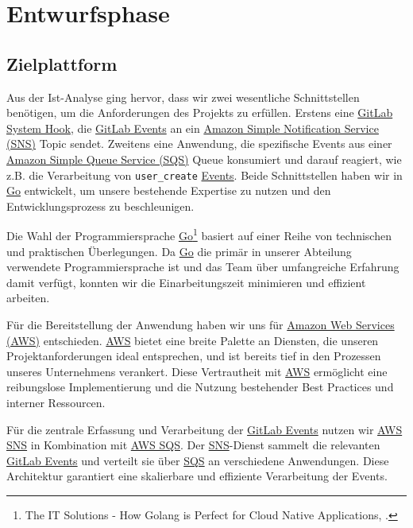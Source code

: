 \section{Entwurfsphase} 
\label{sec:Entwurfsphase}

\subsection{Zielplattform}
\label{sec:Zielplattform}

Aus der Ist-Analyse ging hervor, dass wir zwei wesentliche Schnittstellen benötigen, um die Anforderungen des Projekts zu erfüllen. Erstens eine \hyperlink{GitLabSystemhooks}{\textcolor{AOBlau}{GitLab System Hook}}, die \hyperlink{GitLabEvent}{\textcolor{AOBlau}{GitLab Events}} an ein \hyperlink{SNS}{\textcolor{AOBlau}{Amazon Simple Notification Service (SNS)}} Topic sendet. Zweitens eine Anwendung, die spezifische Events aus einer \hyperlink{SQS}{\textcolor{AOBlau}{Amazon Simple Queue Service (SQS)}} Queue konsumiert und darauf reagiert, wie z.B. die Verarbeitung von \texttt{user\_create} \hyperlink{GitLabEvent}{\textcolor{AOBlau}{Events}}. Beide Schnittstellen haben wir in \hyperlink{Go}{\textcolor{AOBlau}{Go}} entwickelt, um unsere bestehende Expertise zu nutzen und den Entwicklungsprozess zu beschleunigen.

Die Wahl der Programmiersprache \hyperlink{Go}{\textcolor{AOBlau}{Go}}\footnote{The IT Solutions - How Golang is Perfect for Cloud Native Applications, \cite{Go}.} basiert auf einer Reihe von technischen und praktischen Überlegungen. Da \hyperlink{Go}{\textcolor{AOBlau}{Go}} die primär in unserer Abteilung verwendete Programmiersprache ist und das Team über umfangreiche Erfahrung damit verfügt, konnten wir die Einarbeitungszeit minimieren und effizient arbeiten.

Für die Bereitstellung der Anwendung haben wir uns für \hyperlink{AWS}{\textcolor{AOBlau}{Amazon Web Services (AWS)}} entschieden. \hyperlink{AWS}{\textcolor{AOBlau}{AWS}} bietet eine breite Palette an Diensten, die unseren Projektanforderungen ideal entsprechen, und ist bereits tief in den Prozessen unseres Unternehmens verankert. Diese Vertrautheit mit \hyperlink{AWS}{\textcolor{AOBlau}{AWS}} ermöglicht eine reibungslose Implementierung und die Nutzung bestehender Best Practices und interner Ressourcen.

Für die zentrale Erfassung und Verarbeitung der \hyperlink{GitLabEvent}{\textcolor{AOBlau}{GitLab Events}} nutzen wir \hyperlink{SNS}{\textcolor{AOBlau}{AWS SNS}} in Kombination mit \hyperlink{SQS}{\textcolor{AOBlau}{AWS SQS}}. Der \hyperlink{SNS}{\textcolor{AOBlau}{SNS}}-Dienst sammelt die relevanten \hyperlink{GitLabEvent}{\textcolor{AOBlau}{GitLab Events}} und verteilt sie über \hyperlink{SQS}{\textcolor{AOBlau}{SQS}} an verschiedene Anwendungen. Diese Architektur garantiert eine skalierbare und effiziente Verarbeitung der Events.

